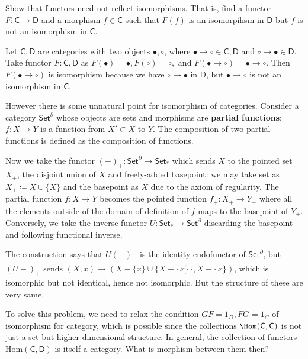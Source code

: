 \begin{exer} Show that functors need not reflect isomorphisms. That is, find a functor $F:\mathsf{C}\rightarrow \mathsf{D}$ and a morphism $f\in\mathsf{C}$ such that $F(f)$ is an isomorpihsm in $\mathsf{D}$ but $f$ is not an isomorphism in $\mathsf{C}$.
\end{exer}
\begin{solution} Let $\mathsf{C},\mathsf{D}$ are categories with two objects $\bullet,\circ$, where $\bullet\rightarrow \circ\in\mathsf{C},\mathsf{D}$ and $\circ\rightarrow \bullet\in\mathsf{D}$. Take functor $F:\mathsf{C},\mathsf{D}$ as $F(\bullet)=\bullet, F(\circ)=\circ,$ and $F(\bullet\rightarrow\circ)=\bullet\rightarrow \circ$. Then $F(\bullet\rightarrow\circ)$ is isomorphism because we have $\circ\rightarrow \bullet$ in $\mathsf{D}$, but $\bullet\rightarrow \circ$ is not an isomorphism in $\mathsf{C}$.
\end{solution}

However there is some unnatural point for isomorphism of categories. Consider a category $\mathsf{Set}^{\partial}$ whose objects are sets and morphisms are \textbf{partial functions}: $f:X\rightarrow Y$ is a function from $X'\subset X$ to $Y$. The composition of two partial functions is defined as the composition of functions.

Now we take the functor $(-)_+:\mathsf{Set}^\partial \rightarrow \mathsf{Set}_*$ which sends $X$ to the pointed set $X_+$, the disjoint union of $X$ and freely-added basepoint: we may take set as $X_+\coloneqq X\cup \{X\}$ and the basepoint as $X$ due to the axiom of regularity. The partial function $f:X\rightarrow Y$ becomes the pointed function $f_+:X_+\rightarrow Y_+$ where all the elements outside of the domain of definition of $f$ maps to the basepoint of $Y_+$. Conversely, we take the inverse functor $U:\mathsf{Set}_*\rightarrow \mathsf{Set}^\partial$ discarding the basepoint and following functional inverse.

The construction says that $U(-)_+$ is the identity endofunctor of $\mathsf{Set}^\partial$, but $(U-)_+$ sends $(X,x)\rightarrow (X-\{x\}\cup \{X-\{x\}\},X-\{x\})$, which is isomorphic but not identical, hence not isomorphic. But the structure of these are very same.

To solve this problem, we need to relax the condition $GF=1_D,FG=1_C$ of isomorphism for category, which is possible since the collections $\Hom(\mathsf{C},\mathsf{C})$ is not just a set but higher-dimensional structure. In general, the collection of functors $\mathrm{Hom}(\mathsf{C},\mathsf{D})$ is itself a category. What is morphism between them then?

